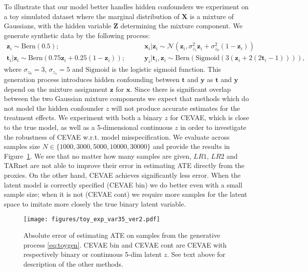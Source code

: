 \documentclass{article}
\def\*#1{\mathbf{#1}}
\begin{document}
To illustrate that our model better handles hidden confounders we experiment on a toy simulated dataset where the marginal distribution of $\*X$ is a mixture of Gaussians, with the hidden variable $\*Z$ determining the mixture component. We generate synthetic data by the following process:
\begin{align}\label{eq:toygen}
\*z_i \sim \text{Bern}\left(0.5\right); & \qquad \*x_i | \*z_i \sim \mathcal{N}\left(\*z_i, \sigma^2_{z_1} \*z_i + \sigma^2_{z_0} (1 - \*z_i)\right) \nonumber\\
\*t_i |\*z_i \sim \text{Bern}\left(0.75 \*z_i + 0.25 (1 - \*z_i)\right); & \qquad  \*y_i |\*t_i,\*z_i \sim \text{Bern}\left(\text{Sigmoid}\left(3(\*z_i +2 (2\*t_i - 1))\right)\right),
\end{align}
where $\sigma_{z_0} = 3$, $\sigma_{z_1} = 5$ and $\text{Sigmoid}$ is the logistic sigmoid function. This generation process introduces hidden confounding between $\*t$ and $\*y$ as $\*t$ and $\*y$ depend on the mixture assignment $\*z$ for $\*x$. Since there is significant overlap between the two Gaussian mixture components we expect that methods which do not model the hidden confounder $z$ will not produce accurate estimates for the treatment effects. We experiment with both a binary $z$ for CEVAE, which is close to the true model, as well as a 5-dimensional continuous $z$ in order to investigate the robustness of CEVAE w.r.t. model misspecification. We evaluate across samples size $N \in \{1000,3000,5000,10000,30000\}$ and provide the results in Figure~\ref{fig:toy1}.  We see that no matter how many samples are given, $LR1$, $LR2$ and TARnet are not able to improve their error in estimating ATE directly from the proxies. On the other hand, CEVAE achieves significantly less error. When the latent model is correctly specified (CEVAE bin) we do better even with a small sample size; when it is not (CEVAE cont) we require more samples for the latent space to imitate more closely the true binary latent variable.

\begin{figure}[htb]
\centering
\texttt{[image: figures/toy\_exp\_var35\_ver2.pdf]}
\caption{Absolute error of estimating ATE on samples from the generative process \eqref{eq:toygen}. CEVAE bin and CEVAE cont are CEVAE with respectively binary or continuous 5-dim latent $z$. See text above for description of the other methods.}
\label{fig:toy1}
\end{figure}
\end{document}

